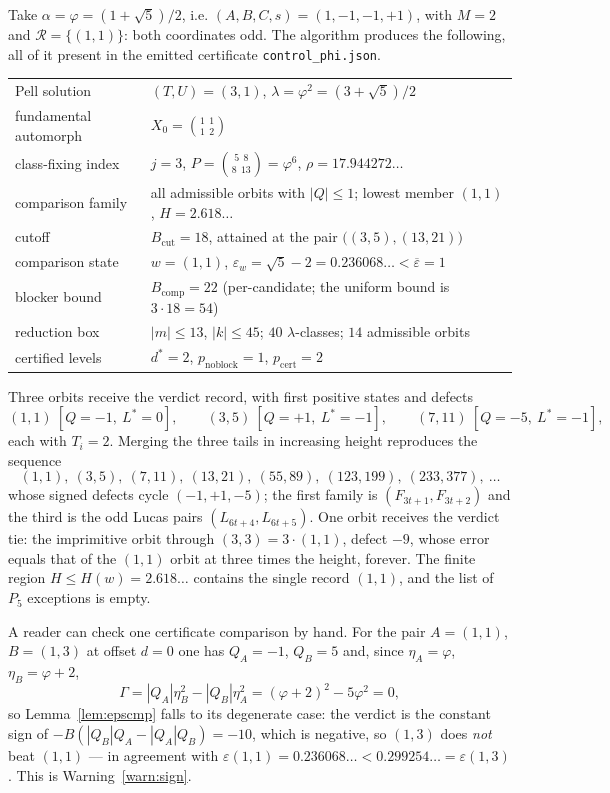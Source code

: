 \documentclass[11pt]{article}
\theoremstyle{definition}
\theoremstyle{remark}
\newcommand{\epsbar}{\overline{\varepsilon}}
\newcommand{\epsw}{\varepsilon_w}
\begin{document}
Take $\alpha=\varphi=(1+\sqrt5)/2$, i.e. $(A,B,C,s)=(1,-1,-1,+1)$, with $M=2$ and
$\mathcal R=\{(1,1)\}$: both coordinates odd. The algorithm produces the following, all of it
present in the emitted certificate \texttt{control\_phi.json}.

\begin{center}\small
\begin{tabular}{@{}ll@{}}
\toprule
Pell solution & $(T,U)=(3,1)$, $\lambda=\varphi^2=(3+\sqrt5)/2$ \\
fundamental automorph & $X_0=\binom{1\ \ 1}{1\ \ 2}$ \\
class-fixing index & $j=3$, $P=\binom{5\ \ 8}{8\ \ 13}=\varphi^6$, $\rho=17.944272\ldots$ \\
comparison family & all admissible orbits with $|Q|\le1$; lowest member $(1,1)$, $H=2.618\ldots$ \\
cutoff & $B_{\mathrm{cut}}=18$, attained at the pair $\bigl((3,5),(13,21)\bigr)$ \\
comparison state & $w=(1,1)$, $\epsw=\sqrt5-2=0.236068\ldots<\epsbar=1$ \\
blocker bound & $B_{\mathrm{comp}}=22$ (per-candidate; the uniform bound is $3\cdot18=54$) \\
reduction box & $|m|\le13$, $|k|\le45$; $40$ $\lambda$-classes; $14$ admissible orbits \\
certified levels & $d^{*}=2$, $p_{\mathrm{noblock}}=1$, $p_{\mathrm{cert}}=2$ \\
\bottomrule
\end{tabular}
\end{center}

Three orbits receive the verdict \textsf{record}, with first positive states and defects
\[
(1,1)\ [Q=-1,\ L^{*}=0],\qquad
(3,5)\ [Q=+1,\ L^{*}=-1],\qquad
(7,11)\ [Q=-5,\ L^{*}=-1],
\]
each with $T_i=2$. Merging the three tails in increasing height reproduces the sequence
\[
(1,1),\ (3,5),\ (7,11),\ (13,21),\ (55,89),\ (123,199),\ (233,377),\ \dots
\]
whose signed defects cycle $(-1,+1,-5)$; the first family is $(F_{3t+1},F_{3t+2})$ and the third
is the odd Lucas pairs $(L_{6t+4},L_{6t+5})$. One orbit receives the verdict \textsf{tie}: the
imprimitive orbit through $(3,3)=3\cdot(1,1)$, defect $-9$, whose error equals that of the
$(1,1)$ orbit at three times the height, forever. The finite region $H\le H(w)=2.618\ldots$
contains the single record $(1,1)$, and the list of $P_5$ exceptions is empty.

A reader can check one certificate comparison by hand. For the pair $A=(1,1)$, $B=(1,3)$ at
offset $d=0$ one has $Q_A=-1$, $Q_B=5$ and, since $\eta_A=\varphi$, $\eta_B=\varphi+2$,
\[
\Gamma=|Q_A|\eta_B^2-|Q_B|\eta_A^2=(\varphi+2)^2-5\varphi^2=0 ,
\]
so Lemma~\ref{lem:epscmp} falls to its degenerate case: the verdict is the constant sign of
$-B(|Q_B|Q_A-|Q_A|Q_B)=-10$, which is negative, so $(1,3)$ does \emph{not} beat $(1,1)$ --- in
agreement with $\varepsilon(1,1)=0.236068\ldots<0.299254\ldots=\varepsilon(1,3)$. This is
Warning~\ref{warn:sign}.
\end{document}
